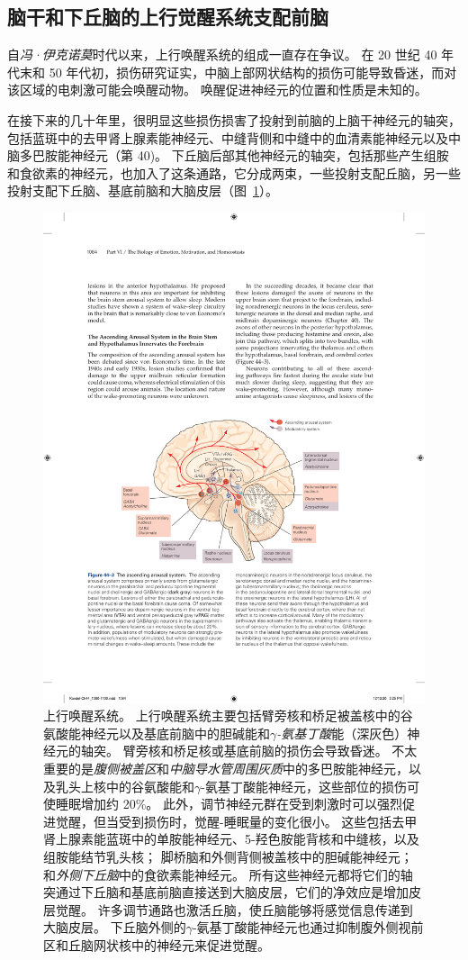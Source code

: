\subsection{脑干和下丘脑的上行觉醒系统支配前脑}

自\textit{冯·伊克诺莫}时代以来，上行唤醒系统的组成一直存在争议。
在 20 世纪 40 年代末和 50 年代初，损伤研究证实，中脑上部网状结构的损伤可能导致昏迷，而对该区域的电刺激可能会唤醒动物。
唤醒促进神经元的位置和性质是未知的。


在接下来的几十年里，很明显这些损伤损害了投射到前脑的上脑干神经元的轴突，包括蓝斑中的去甲肾上腺素能神经元、中缝背侧和中缝中的血清素能神经元以及中脑多巴胺能神经元（第 40)。
下丘脑后部其他神经元的轴突，包括那些产生组胺和食欲素的神经元，也加入了这条通路，它分成两束，一些投射支配丘脑，另一些投射支配下丘脑、基底前脑和大脑皮层（图~\ref{fig:44_3}）。


\begin{figure}[htbp]
	\centering
	\includegraphics[width=0.85\linewidth]{chap44/fig_44_3}
	\caption{上行唤醒系统。
		上行唤醒系统主要包括臂旁核和桥足被盖核中的谷氨酸能神经元以及基底前脑中的胆碱能和\textit{$\gamma$-氨基丁酸}能（深灰色）神经元的轴突。
		臂旁核和桥足核或基底前脑的损伤会导致昏迷。
		不太重要的是\textit{腹侧被盖区}和\textit{中脑导水管周围灰质}中的多巴胺能神经元，以及乳头上核中的谷氨酸能和$\gamma$-氨基丁酸能神经元，这些部位的损伤可使睡眠增加约 20\%。
		此外，调节神经元群在受到刺激时可以强烈促进觉醒，但当受到损伤时，觉醒-睡眠量的变化很小。
		这些包括去甲肾上腺素能蓝斑中的单胺能神经元、5-羟色胺能背核和中缝核，以及组胺能结节乳头核；
		脚桥脑和外侧背侧被盖核中的胆碱能神经元；
		和\textit{外侧下丘脑}中的食欲素能神经元。
		所有这些神经元都将它们的轴突通过下丘脑和基底前脑直接送到大脑皮层，它们的净效应是增加皮层觉醒。
		许多调节通路也激活丘脑，使丘脑能够将感觉信息传递到大脑皮层。
		下丘脑外侧的$\gamma$-氨基丁酸能神经元也通过抑制腹外侧视前区和丘脑网状核中的神经元来促进觉醒。}
	\label{fig:44_3}
\end{figure}


